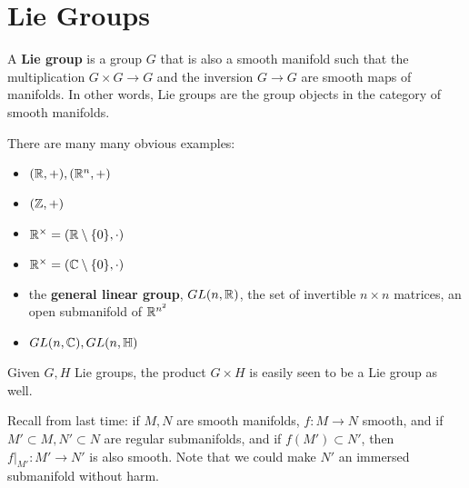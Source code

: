 \documentclass{../mathnotes}
\begin{document}
\section{Lie Groups}

\begin{defn}
    A \textbf{Lie group} is a group $G$ that is also a smooth manifold such that the multiplication $G\times G\to G$ and the inversion
    $G\to G$ are smooth maps of manifolds. In other words, Lie groups are the group objects in the category of smooth manifolds.
\end{defn}

\begin{exmp}
    There are many many obvious examples:
    \begin{itemize}
        \item $(\mathbb{R},+), (\mathbb{R}^n,+)$
        \item $(\mathbb{Z},+)$
        \item $\mathbb{R}^\times=(\mathbb{R}\setminus\{0\},\cdot)$
        \item $\mathbb{R}^\times=(\mathbb{C}\setminus\{0\},\cdot)$
        \item the \textbf{general linear group}, $GL(n,\mathbb{R})$, the set of invertible $n\times n$ matrices, an open submanifold of $\mathbb{R}^{n^2}$
        \item $GL(n,\mathbb{C}), GL(n,\mathbb{H})$
    \end{itemize}
\end{exmp}

\begin{rem}
    Given $G,H$ Lie groups, the product $G\times H$ is easily seen to be a Lie group as well.
\end{rem}

Recall from last time: if $M,N$ are smooth manifolds, $f:M\to N$ smooth, and if $M'\subset M, N'\subset N$ are regular submanifolds, and if $f(M')\subset N'$, then
$f\bigg|_{M'}:M'\to N'$ is also smooth. Note that we could make $N'$ an immersed submanifold without harm.
\end{document}
